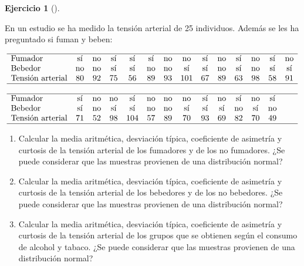 \documentclass[
  a4paper,
]{scrreport}
\theoremstyle{definition}
\newtheorem{exercise}{Ejercicio}[chapter]
\theoremstyle{remark}
\begin{document}
\begin{exercise}[]\protect\hypertarget{exr-descriptiva-tension}{}\label{exr-descriptiva-tension}

En un estudio se ha medido la tensión arterial de 25 individuos. Además
se les ha preguntado si fuman y beben:

\[
\begin{array}{lccccccccccccc}
\hline
\mbox{Fumador}  & \mbox{sí} & \mbox{no} & \mbox{sí} & \mbox{sí} & \mbox{sí} & \mbox{no} & \mbox{no} & \mbox{sí} & \mbox{no} & \mbox{sí} & \mbox{no} & \mbox{sí} & \mbox{no} \\
\mbox{Bebedor} & \mbox{no} & \mbox{no} & \mbox{sí} & \mbox{sí} & \mbox{no} & \mbox{no} & \mbox{sí} & \mbox{sí} & \mbox{no} & \mbox{sí} & \mbox{no} & \mbox{sí} & \mbox{sí} \\
\mbox{Tensión arterial} & 80 & 92 & 75 & 56 & 89 & 93 & 101 & 67 & 89 & 63 & 98 & 58 & 91 \\
\hline
\\
\hline
\mbox{Fumador}  & \mbox{sí} & \mbox{no} & \mbox{no} & \mbox{sí} & \mbox{no} & \mbox{no} & \mbox{no} & \mbox{sí} & \mbox{no} & \mbox{sí} & \mbox{no} & \mbox{sí} \\
\mbox{Bebedor} & \mbox{sí} & \mbox{no} & \mbox{sí} & \mbox{sí} & \mbox{no} & \mbox{no} & \mbox{sí} & \mbox{sí} & \mbox{sí} & \mbox{no} & \mbox{sí} & \mbox{no} \\
\mbox{Tensión arterial} & 71 & 52 & 98 & 104 & 57 & 89 & 70 & 93 & 69 & 82 & 70 & 49 \\
\hline
\end{array}
\]

\begin{enumerate}
\def\labelenumi{\alph{enumi}.}
\item
  Calcular la media aritmética, desviación típica, coeficiente de
  asimetría y curtosis de la tensión arterial de los fumadores y de los
  no fumadores. ¿Se puede considerar que las muestras provienen de una
  distribución normal?
\item
  Calcular la media aritmética, desviación típica, coeficiente de
  asimetría y curtosis de la tensión arterial de los bebedores y de los
  no bebedores. ¿Se puede considerar que las muestras provienen de una
  distribución normal?
\item
  Calcular la media aritmética, desviación típica, coeficiente de
  asimetría y curtosis de la tensión arterial de los grupos que se
  obtienen según el consumo de alcohol y tabaco. ¿Se puede considerar
  que las muestras provienen de una distribución normal?
\end{enumerate}

\end{exercise}
\end{document}
